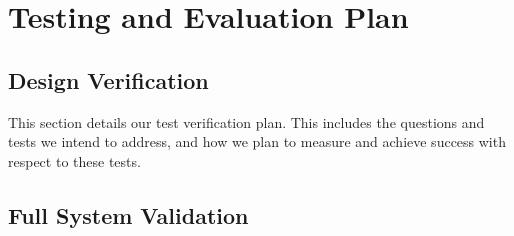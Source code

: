 
\section{Testing and Evaluation Plan}
\label{sec:te_plan}


\subsection{Design Verification}

This section details our test verification plan. This includes the questions and tests we intend to address, and how we plan to measure and achieve success with respect to these tests.

\label{sec:verification}









\subsection{Full System Validation}
\label{sec:system_validation}
